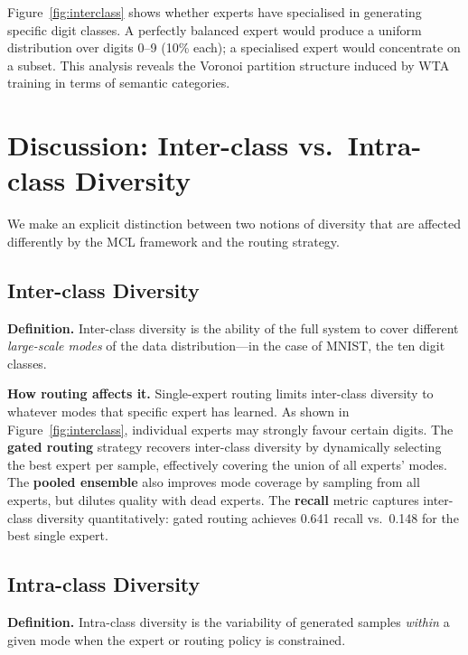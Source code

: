 \documentclass[11pt,a4paper]{article}
\begin{document}
Figure~\ref{fig:interclass} shows whether experts have specialised in generating
specific digit classes. A perfectly balanced expert would produce a uniform
distribution over digits 0--9 (10\% each); a specialised expert would
concentrate on a subset. This analysis reveals the Voronoi partition
structure induced by WTA training in terms of semantic categories.

\section{Discussion: Inter-class vs.\ Intra-class Diversity}
\label{sec:diversity}

We make an explicit distinction between two notions of diversity that are
affected differently by the MCL framework and the routing strategy.

\subsection{Inter-class Diversity}

\textbf{Definition.} Inter-class diversity is the ability of the full
system to cover different \emph{large-scale modes} of the data
distribution---in the case of MNIST, the ten digit classes.

\textbf{How routing affects it.} Single-expert routing limits inter-class
diversity to whatever modes that specific expert has learned. As shown in
Figure~\ref{fig:interclass}, individual experts may strongly favour certain
digits. The \textbf{gated routing} strategy recovers inter-class diversity
by dynamically selecting the best expert per sample, effectively covering
the union of all experts' modes. The \textbf{pooled ensemble} also improves
mode coverage by sampling from all experts, but dilutes quality with dead
experts. The \textbf{recall} metric captures inter-class diversity
quantitatively: gated routing achieves 0.641 recall vs.\ 0.148 for the
best single expert.

\subsection{Intra-class Diversity}

\textbf{Definition.} Intra-class diversity is the variability of generated
samples \emph{within} a given mode when the expert or routing policy is
constrained.
\end{document}
